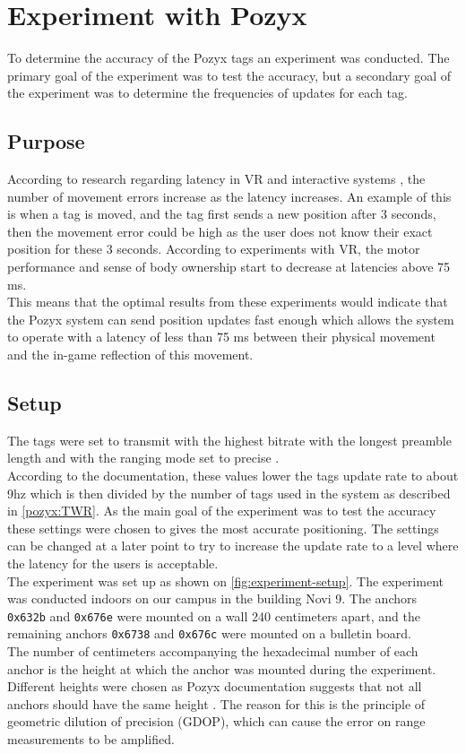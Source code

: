 \section{Experiment with Pozyx}\label{sprint1:experiment}
To determine the accuracy of the Pozyx tags an experiment was conducted.
The primary goal of the experiment was to test the accuracy, but a secondary goal of the experiment was to determine the frequencies of updates for each tag.
\\
\subsection{Purpose}
According to research regarding latency in VR \cite{WaltemateThomas2016Tiol} and interactive systems \cite{10.1145/169059.169431}, the number of movement errors increase as the latency increases.
An example of this is when a tag is moved, and the tag first sends a new position after 3 seconds, then the movement error could be high as the user does not know their exact position for these 3 seconds.
According to experiments with VR, the motor performance and sense of body ownership start to decrease at latencies above 75 ms.\\
This means that the optimal results from these experiments would indicate that the Pozyx system can send position updates fast enough which allows the system to operate with a latency of less than 75 ms between their physical movement and the in-game reflection of this movement.

\subsection{Setup}
The tags were set to transmit with the highest bitrate with the longest preamble length and with the ranging mode set to precise \cite{pozyx-Performance}.\\
According to the documentation, these values lower the tags update rate to about 9hz which is then divided by the number of tags used in the system as described in \autoref{pozyx:TWR}.
As the main goal of the experiment was to test the accuracy these settings were chosen to gives the most accurate positioning.
The settings can be changed at a later point to try to increase the update rate to a level where the latency for the users is acceptable.\\
The experiment was set up as shown on \autoref{fig:experiment-setup}.
The experiment was conducted indoors on our campus in the building Novi 9.
The anchors \texttt{0x632b} and \texttt{0x676e} were mounted on a wall 240 centimeters apart, and the remaining anchors \texttt{0x6738} and \texttt{0x676c} were mounted on a bulletin board.\\
The number of centimeters accompanying the hexadecimal number of each anchor is the height at which the anchor was mounted during the experiment.
Different heights were chosen as Pozyx documentation suggests that not all anchors should have the same height \cite{pozyx-AnchorHeights}.
The reason for this is the principle of geometric dilution of precision (GDOP), which can cause the error on range measurements to be amplified.

